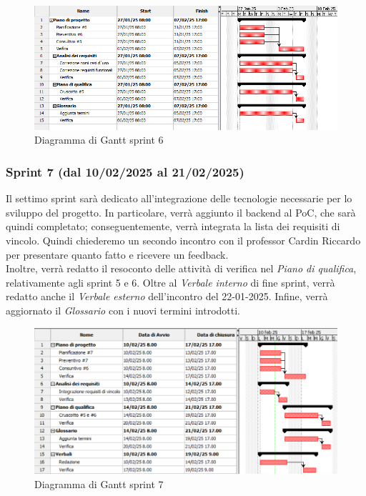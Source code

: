 \begin{figure}[h!]
    \centering
    \includegraphics[scale = 0.6]{template/images/gantt6.png}
    \caption{Diagramma di Gantt sprint 6}
    \label{fig:3.6} %
\end{figure}

\subsubsection{Sprint 7 (dal 10/02/2025 al 21/02/2025)}
Il settimo sprint sarà dedicato all'integrazione delle tecnologie necessarie
per lo sviluppo del progetto. In particolare, verrà aggiunto il backend al PoC,
che sarà quindi completato; conseguentemente, verrà integrata la lista dei
requisiti di vincolo. Quindi chiederemo un secondo incontro con il professor
Cardin Riccardo per presentare quanto fatto e ricevere un feedback.\\ Inoltre,
verrà redatto il resoconto delle attività di verifica nel \textit{Piano di
qualifica}, relativamente agli sprint 5 e 6. Oltre al \textit{Verbale interno} 
di fine sprint, verrà redatto anche il \textit{Verbale esterno} dell'incontro
del 22-01-2025. Infine, verrà aggiornato il \textit{Glossario} con i nuovi termini introdotti.
\begin{figure}[h!]
    \centering
    \includegraphics[scale = 0.65]{template/images/gantt7.png}
    \caption{Diagramma di Gantt sprint 7}
    \label{fig:3.7} %
\end{figure}

